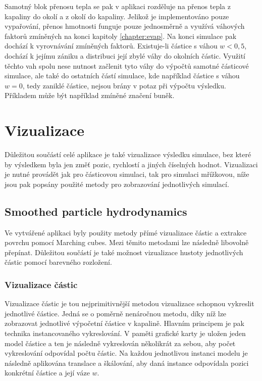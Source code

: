 Samotný blok přenosu tepla se pak v aplikaci rozděluje na přenos tepla z kapaliny do okolí a z okolí do kapaliny. Jelikož je implementováno pouze vypařování, přenos hmotnosti funguje pouze jednosměrně a využívá váhových faktorů zmíněných na konci kapitoly \ref{chapter:evap}. Na konci simulace pak dochází k vyrovnávání zmíněných faktorů. Existuje-li částice s váhou $w < 0,5$, dochází k jejímu zániku a distribuci její zbylé váhy do okolních částic. Využití těchto vah spolu nese nutnost začlenit tyto váhy do výpočtů samotné částicové simulace, ale také do ostatních částí simulace, kde například částice s váhou $w = 0$, tedy zaniklé částice, nejsou brány v potaz při výpočtu výsledku. Příkladem může být například zmíněné značení buněk.

\section{Vizualizace}
\label{chapter:Vizualizace}
Důležitou součástí celé aplikace je také vizualizace výsledku simulace, bez které by výsledkem byla jen změť pozic, rychlostí a jiných číselných hodnot. Vizualizaci je nutné provádět jak pro částicovou simulaci, tak pro simulaci mřížkovou, níže jsou pak popsány použité metody pro zobrazování jednotlivých simulací.

\subsection{Smoothed particle hydrodynamics}
\label{chapter:vizSPH}
Ve vytvářené aplikaci byly použity metody přímé vizualizace částic a extrakce povrchu pomocí Marching cubes. Mezi těmito metodami lze následně libovolně přepínat. Důležitou součástí je také možnost vizualizace hustoty jednotlivých částic pomocí barevného rozložení.

\subsubsection{Vizualizace částic}
Vizualizace částic je tou nejprimitivnější metodou vizualizace schopnou vykreslit jednotlivé částice. Jedná se o poměrně nenáročnou metodu, díky níž lze zobrazovat jednotlivé výpočetní částice v kapalině. Hlavním principem je pak technika instancovaného vykreslování. V paměti grafické karty je uložen jeden model částice a ten je následně vykreslován několikrát za sebou, aby počet vykreslování odpovídal počtu částic. Na každou jednotlivou instanci modelu je následně aplikována translace a škálování, aby daná instance odpovídala pozici konkrétní částice a její váze $w$.

